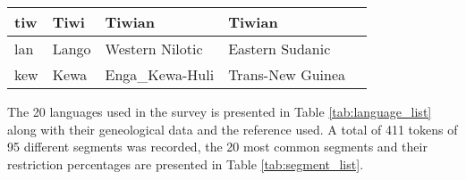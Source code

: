 \begin{table}[h]
{\begin{tabular}{|l|l|l|l|l|}
tiw  & Tiwi                                                          & Tiwian                                                                  & Tiwian               &     \citet{osborneTiwiLanguageGrammar1974}      \\ \hline
lan  & Lango                                                         & Western Nilotic                                                         & Eastern Sudanic      &     \citet{noonanGrammarLango1992}      \\ \hline
kew  & Kewa                                                          & Enga\_Kewa-Huli                                                         & Trans-New Guinea     &     \citet{franklinGrammarKewaNew1971} \\ \hline
\end{tabular}}
\end{table}

The 20 languages used in the survey is presented in Table \ref{tab:language_list} along with their geneological data and the reference used. A total of 411 tokens of 95 different segments was recorded, the 20 most common segments and their restriction percentages are presented in Table \ref{tab:segment_list}.

